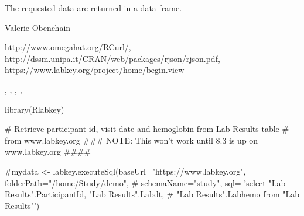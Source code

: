\begin{Value}
The requested data are returned in a data frame.
\end{Value}
\begin{Author}\relax
Valerie Obenchain
\end{Author}
\begin{References}\relax
http://www.omegahat.org/RCurl/,\\ 
http://dssm.unipa.it/CRAN/web/packages/rjson/rjson.pdf,\\
https://www.labkey.org/project/home/begin.view
\end{References}
\begin{SeeAlso}\relax
{}, , , 
, 
\end{SeeAlso}
\begin{Examples}
\begin{ExampleCode}

library(Rlabkey)

# Retrieve participant id, visit date and hemoglobin from Lab Results table
# from www.labkey.org
### NOTE: This won't work until 8.3 is up on www.labkey.org ####

#mydata <- labkey.executeSql(baseUrl="https://www.labkey.org", folderPath="/home/Study/demo", 
# schemaName="study", sql= 'select "Lab Results".ParticipantId, "Lab Results".Labdt, 
# "Lab Results".Labhemo from "Lab Results"')

\end{ExampleCode}
\end{Examples}


